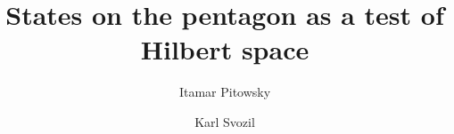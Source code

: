\documentclass[prl,preprint,showpacs,showkeys]{revtex4}
\usepackage{graphicx}





\title{States on the pentagon as a test of Hilbert space}
\author{Itamar Pitowsky}
\author{Karl Svozil}


\begin{abstract}
By Gleason's theorem,
quantum probabilities are strongly tied to
Hilbert space.
An experiment is proposed to test these quantum probabilities
on specific quantum structures which allow more general propability measures.
If such measures were indeed found, then the only consistent alternative
would be either the abandonment of Hilbert space, or of the most reasonable requirements
of probability theory, such as subadditivity.
\end{abstract}


\maketitle






%
%



